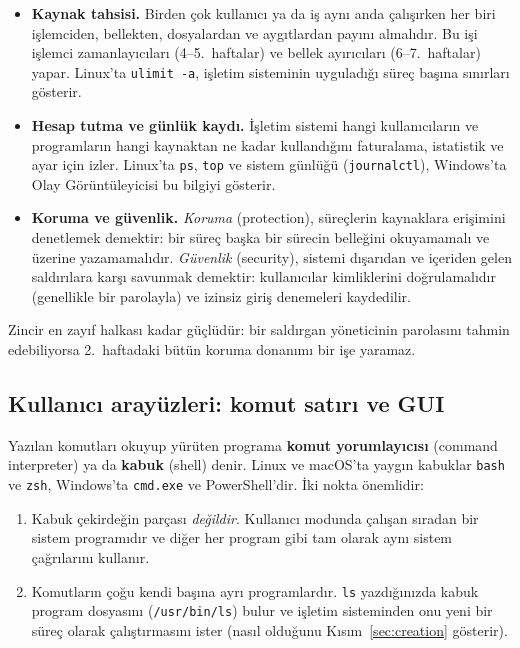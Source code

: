 \documentclass[11pt,a4paper]{article}
\newcommand{\term}[1]{\textbf{\color{mintdeep}#1}}
\newcommand{\cmd}[1]{\texttt{#1}}
\begin{document}
\begin{itemize}
  \item \textbf{Kaynak tahsisi.} Birden çok kullanıcı ya da iş aynı anda çalışırken her biri işlemciden, bellekten, dosyalardan ve aygıtlardan payını almalıdır. Bu işi işlemci zamanlayıcıları (4--5.~haftalar) ve bellek ayırıcıları (6--7.~haftalar) yapar. Linux'ta \cmd{ulimit -a}, işletim sisteminin uyguladığı süreç başına sınırları gösterir.
  \item \textbf{Hesap tutma ve günlük kaydı.} İşletim sistemi hangi kullanıcıların ve programların hangi kaynaktan ne kadar kullandığını faturalama, istatistik ve ayar için izler. Linux'ta \cmd{ps}, \cmd{top} ve sistem günlüğü (\cmd{journalctl}), Windows'ta Olay Görüntüleyicisi bu bilgiyi gösterir.
  \item \textbf{Koruma ve güvenlik.} \emph{Koruma} (protection), süreçlerin kaynaklara erişimini denetlemek demektir: bir süreç başka bir sürecin belleğini okuyamamalı ve üzerine yazamamalıdır. \emph{Güvenlik} (security), sistemi dışarıdan ve içeriden gelen saldırılara karşı savunmak demektir: kullanıcılar kimliklerini doğrulamalıdır (genellikle bir parolayla) ve izinsiz giriş denemeleri kaydedilir.
\end{itemize}

Zincir en zayıf halkası kadar güçlüdür: bir saldırgan yöneticinin parolasını tahmin edebiliyorsa 2.~haftadaki bütün koruma donanımı bir işe yaramaz.

\subsection{Kullanıcı arayüzleri: komut satırı ve GUI}

Yazılan komutları okuyup yürüten programa \term{komut yorumlayıcısı} (command interpreter) ya da \term{kabuk} (shell) denir. Linux ve macOS'ta yaygın kabuklar \cmd{bash} ve \cmd{zsh}, Windows'ta \cmd{cmd.exe} ve PowerShell'dir. İki nokta önemlidir:

\begin{enumerate}[leftmargin=1.4em]
  \item Kabuk çekirdeğin parçası \emph{değildir}. Kullanıcı modunda çalışan sıradan bir sistem programıdır ve diğer her program gibi tam olarak aynı sistem çağrılarını kullanır.
  \item Komutların çoğu kendi başına ayrı programlardır. \cmd{ls} yazdığınızda kabuk program dosyasını (\texttt{/usr/\allowbreak bin/\allowbreak ls}) bulur ve işletim sisteminden onu yeni bir süreç olarak çalıştırmasını ister (nasıl olduğunu Kısım~\ref{sec:creation} gösterir).
\end{enumerate}
\end{document}

